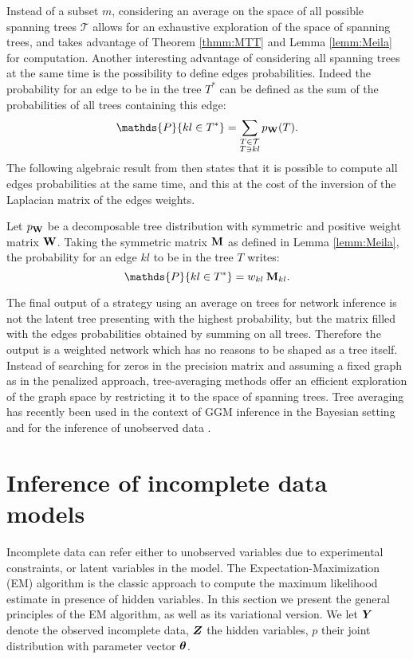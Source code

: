Instead of a subset $m$, considering an average on the space of all possible spanning trees $\mathcal{T}$ allows for an exhaustive exploration of the space of spanning trees, and takes advantage of Theorem \ref{thmm:MTT} and Lemma \ref{lemm:Meila} for computation. 
Another interesting advantage of considering all spanning trees at the same time is the possibility to define edges probabilities. Indeed the probability for an edge to be in the tree $T^*$ can be defined as the sum of the probabilities of all trees containing this edge:
$$\mathds{P}\{kl\in T^*\} = \sum_{\substack{T\in \mathcal{T}\\ T \ni kl}} p_{\Wbf}(T).$$
The following algebraic result from \cite{kirshner} then  states that it is possible to compute all edges probabilities at the same time, and this at the cost of the inversion of the  Laplacian matrix of the edges weights.

\begin{lemma}  \label{lem:Kirshner}
    Let $p_{{\bf W}}$ be a decomposable tree distribution with symmetric and positive weight matrix ${\bf W}$. Taking the symmetric matrix ${\bf M}$ as defined in Lemma  \ref{lemm:Meila}, the probability for an edge $kl$ to be in the tree $T$ writes:
$$\mathds{P}\{kl\in T^*\} =  w_{kl}\: \Mbf_{kl}.$$
\end{lemma}The final output of a strategy using an average on trees for network inference is not the latent tree presenting with the highest probability, but the matrix filled with the edges probabilities obtained by summing on all trees. Therefore the output is a weighted network which has no reasons to be shaped as a tree itself. Instead of searching for zeros in the precision matrix and assuming a fixed graph as in the penalized approach, tree-averaging methods offer an efficient exploration of the graph space by restricting it to the space of spanning trees. Tree averaging has recently been used in the context of GGM inference in the Bayesian setting \citep{SR15} and for the inference of unobserved data \citep{RAR19}.


\section{Inference of incomplete data models}
Incomplete data can refer either to unobserved variables due to experimental constraints, or latent variables in the model. The Expectation-Maximization (EM) algorithm \citep{DLR77} is the classic approach to compute the maximum likelihood estimate in presence of hidden variables. In this section we present the general principles of the EM algorithm, as well as its variational version. We let ${\boldsymbol{Y}}$ denote the observed incomplete data, ${\boldsymbol{Z}}$ the hidden variables, $p$ their joint distribution with parameter vector ${\boldsymbol{\theta}}$.
 
